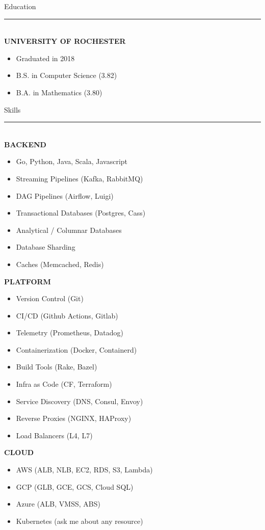 \documentclass[letterpaper]{article}
\makeatletter
\newcommand{\fillbox}[1]{\resizebox{\textwidth}{!}{\begin{tabular}{@{}l@{}} #1 \end{tabular}}}
\makeatother
\begin{document}
	\noindent{}\noindent
	\begin{bgbox}[height=\paperheight, colback=gray!15, width=0.38\textwidth, left=0.12in, right=0.11in]\raggedright
		\vspace*{-4pt}
		\fillbox{\thin Brandon\\[-6pt] \thin Willett}\vspace*{12pt}
		{\Huge{Education}}\\[-6pt]
		\noindent\rule{\textwidth}{1pt}\\[12pt]
		\textbf{UNIVERSITY OF ROCHESTER}
		\begin{itemize} [noitemsep,topsep=4pt]
			\item Graduated in 2018
			\item B.S. in Computer Science (3.82)
			\item B.A. in Mathematics (3.80)
		\end{itemize}
		\vspace*{20pt}
		{\Huge{Skills}}\\[-6pt]
		\noindent\rule{\textwidth}{1pt}\\[12pt]
		\textbf{BACKEND}
		\begin{itemize} [noitemsep,topsep=4pt]
			\item Go, Python, Java, Scala, Javascript
			\item Streaming Pipelines (Kafka, RabbitMQ)
			\item DAG Pipelines (Airflow, Luigi)
			\item Transactional Databases (Postgres, Cass)
			\item Analytical / Columnar Databases
			\item Database Sharding
			\item Caches (Memcached, Redis)
		\end{itemize}
		\vspace*{12pt}
		\textbf{PLATFORM}
		\begin{itemize} [noitemsep,topsep=4pt]
			\item Version Control (Git)
			\item CI/CD (Github Actions, Gitlab)
			\item Telemetry (Prometheus, Datadog)
			\item Containerization (Docker, Containerd)
			\item Build Tools (Rake, Bazel)
			\item Infra as Code (CF, Terraform)
			\item Service Discovery (DNS, Consul, Envoy)
			\item Reverse Proxies (NGINX, HAProxy)
			\item Load Balancers (L4, L7)
		\end{itemize}
		\vspace*{12pt}
		\textbf{CLOUD}
		\begin{itemize} [noitemsep,topsep=4pt]
			\item AWS (ALB, NLB, EC2, RDS, S3, Lambda)
			\item GCP (GLB, GCE, GCS, Cloud SQL)
			\item Azure (ALB, VMSS, ABS)
			\item Kubernetes (ask me about any resource)
		\end{itemize}
	\end{bgbox}%
\end{document}
